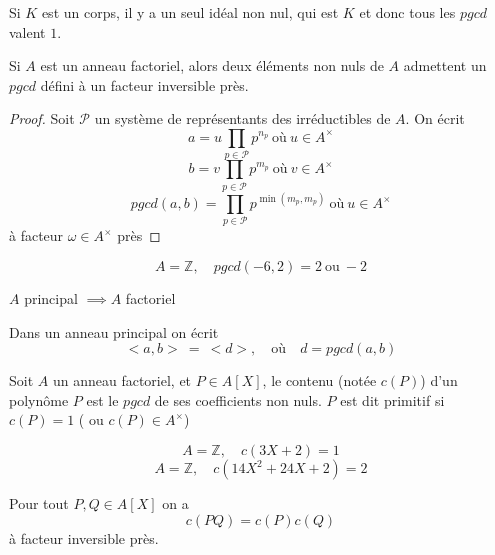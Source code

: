 \begin{remarque}
	Si $K$ est un corps, il y a un seul idéal non nul, qui est $K$ et donc
	tous les $pgcd$ valent $1$.
\end{remarque}

\begin{prop}
	Si $A$ est un anneau factoriel, alors deux éléments non nuls de $A$ admettent un $pgcd$ défini à un facteur inversible près.
\end{prop}

\begin{proof}
	Soit $\mathcal{P}$ un système de représentants des irréductibles de $A$.
	On écrit
	$$ a = u \prod\limits_{p \in \mathcal{P} } p^{n_p} \ \text{où}\  u \in A^\times $$
	$$ b = v \prod \limits_{p \in \mathcal{P} } p^{m_p} \ \text{où}\  v \in A^\times $$
	$$ pgcd(a,b)= \prod \limits_{p \in \mathcal{P}} p^{\min(m_p, m_p)}\  \text{où} \  u \in A^\times $$
	à facteur $\omega \in A^\times$ près
\end{proof}

\begin{example}
	$$A  = \mathbb{Z}, \quad  pgcd(-6,2) = 2\ \text{ou}\ -2$$
\end{example}

\begin{theorem}[admis]
	$A$  principal $\implies A$ factoriel
\end{theorem}

\begin{prop}
	Dans un anneau principal on écrit
	$$ <a,b> \ = \  <d>, \quad \text{où}\quad d = pgcd (a,b) $$
\end{prop}

\begin{definition}
	Soit $A$ un anneau factoriel, et $P \in A[X]$, le contenu (notée $c(P)$) d'un polynôme $P$ est le
	$pgcd$ de ses coefficients non nuls.
	$P$ est dit primitif si $c(P)=1$ ( ou $c(P) \in A^\times$)
\end{definition}


\begin{example}
	$$A  = \mathbb{Z}, \quad  c(3X + 2) = 1$$
	$$A  = \mathbb{Z}, \quad  c(14X^2 + 24X + 2) = 2$$
\end{example}


\begin{lemma}
	Pour tout $P,Q \in A[X]$ on a
	$$ c(PQ) = c(P)c(Q)$$
	à facteur inversible près.
\end{lemma}

